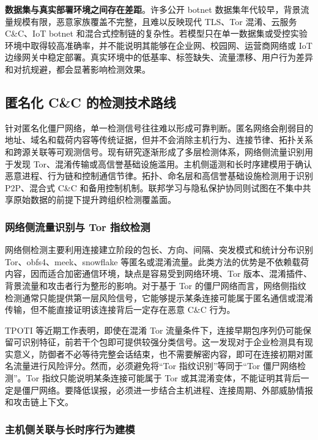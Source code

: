 \textbf{数据集与真实部署环境之间存在差距}。许多公开 botnet 数据集年代较早，背景流量规模有限，恶意家族覆盖不完整，且难以反映现代 TLS、Tor 混淆、云服务 C\&C、IoT botnet 和混合式控制链的复杂性。若模型只在单一数据集或受控实验环境中取得较高准确率，并不能说明其能够在企业网、校园网、运营商网络或 IoT 边缘网关中稳定部署。真实环境中的低基率、标签缺失、流量漂移、用户行为差异和对抗规避，都会显著影响检测效果。

\subsection{匿名化 C\&C 的检测技术路线}
\label{subsec:detection_methods}

针对匿名化僵尸网络，单一检测信号往往难以形成可靠判断。匿名网络会削弱目的地址、域名和载荷内容等传统证据，但并不会消除主机行为、连接节律、拓扑关系和跨源关联等可观测信号。现有研究逐渐形成了多层检测体系，网络侧流量识别用于发现 Tor、混淆传输或高信誉基础设施滥用。主机侧遥测和长时序建模用于确认恶意进程、行为链和控制通信节律。拓扑、命名层和高信誉基础设施检测用于识别 P2P、混合式 C\&C 和备用控制机制。联邦学习与隐私保护协同则试图在不集中共享原始数据的前提下提升跨组织检测覆盖面。

\subsubsection{网络侧流量识别与 Tor 指纹检测}

网络侧检测主要利用连接建立阶段的包长、方向、间隔、突发模式和统计分布识别 Tor、obfs4、meek、snowflake 等匿名或混淆流量。此类方法的优势是不依赖载荷内容，因而适合加密通信环境，缺点是容易受到网络环境、Tor 版本、混淆插件、背景流量和攻击者行为整形的影响。对于基于 Tor 的僵尸网络而言，网络侧指纹检测通常只能提供第一层风险信号，它能够提示某条连接可能属于匿名通信或混淆传输，但不能直接证明该连接背后一定存在恶意 C\&C 行为。

TPOTI 等近期工作表明，即使在混淆 Tor 流量条件下，连接早期包序列仍可能保留可识别特征，前若干个包即可提供较强分类信号\cite{litpoti}。这一发现对于企业检测具有现实意义，防御者不必等待完整会话结束，也不需要解密内容，即可在连接初期对匿名流量进行风险评分。然而，必须避免将“Tor 指纹识别”等同于“Tor 僵尸网络检测”。Tor 指纹只能说明某条连接可能属于 Tor 或其混淆变体，不能证明其背后一定是僵尸网络。要降低误报，必须进一步结合主机进程、连接周期、外部威胁情报和攻击链上下文。

\subsubsection{主机侧关联与长时序行为建模}

